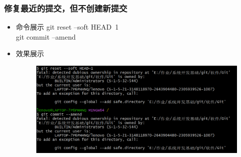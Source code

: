 \documentclass[UTF8]{ctexart}
\begin{document}
\subsubsection{修复最近的提交，但不创建新提交}
\begin{itemize}
  \item 命令展示
 git reset --soft HEAD~1\\
git commit --amend
\item 效果展示
  \begin{figure}[H]
\includegraphics[width=1\textwidth]{6}
\end{figure}
\end{itemize}
\end{document}
